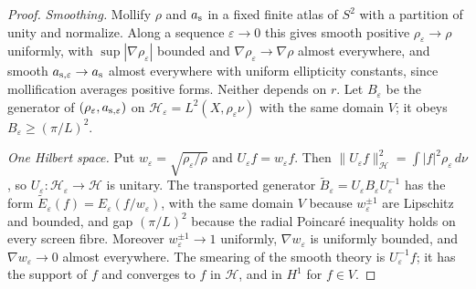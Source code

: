 \documentclass[11pt]{article}
\begin{document}
\begin{proof}
\emph{Smoothing.} Mollify $\rho$ and $a_{\rm s}$ in a fixed finite atlas of
$S^2$ with a partition of unity and normalize. Along a sequence
$\varepsilon\to0$ this gives smooth positive $\rho_\varepsilon\to\rho$
uniformly, with $\sup|\nabla\rho_\varepsilon|$ bounded and
$\nabla\rho_\varepsilon\to\nabla\rho$ almost everywhere, and smooth
$a_{{\rm s},\varepsilon}\to a_{\rm s}$ almost everywhere with uniform
ellipticity constants, since mollification averages positive forms. Neither
depends on $r$. Let $B_\varepsilon$ be the generator of
$(\rho_\varepsilon,a_{{\rm s},\varepsilon})$ on
$\mathcal H_\varepsilon=L^2(X,\rho_\varepsilon\nu)$ with the same domain $V$;
it obeys $B_\varepsilon\geq(\pi/L)^2$.

\emph{One Hilbert space.} Put $w_\varepsilon=\sqrt{\rho_\varepsilon/\rho}$
and $U_\varepsilon f=w_\varepsilon f$. Then
$\|U_\varepsilon f\|_{\mathcal H}^2=\int|f|^2\rho_\varepsilon\,d\nu$, so
$U_\varepsilon:\mathcal H_\varepsilon\to\mathcal H$ is unitary. The
transported generator $\widetilde B_\varepsilon=U_\varepsilon B_\varepsilon
U_\varepsilon^{-1}$ has the form
$\widetilde E_\varepsilon(f)=E_\varepsilon(f/w_\varepsilon)$, with the same
domain $V$ because $w_\varepsilon^{\pm1}$ are Lipschitz and bounded, and
gap $(\pi/L)^2$ because the radial Poincar\'e inequality holds on every
screen fibre. Moreover $w_\varepsilon^{\pm1}\to1$ uniformly,
$\nabla w_\varepsilon$ is uniformly bounded, and
$\nabla w_\varepsilon\to0$ almost everywhere. The smearing of the smooth
theory is $U_\varepsilon^{-1}f$; it has the support of $f$ and converges to
$f$ in $\mathcal H$, and in $H^1$ for $f\in V$.


\end{proof}
\end{document}
